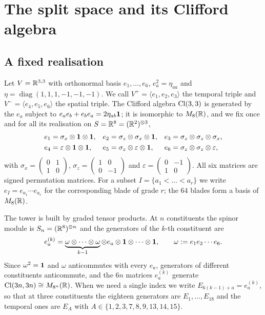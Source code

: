 \section{The split space and its Clifford algebra}
\label{sec:arena}

\subsection{A fixed realisation}

Let $V=\mathbb{R}^{3,3}$ with orthonormal basis $e_1,\dots,e_6$, $e_a^2=\eta_{aa}$ and $\eta=\operatorname{diag}(1,1,1,-1,-1,-1)$.
We call $V^+=\langle e_1,e_2,e_3\rangle$ the temporal triple and $V^-=\langle e_4,e_5,e_6\rangle$ the spatial triple. The
Clifford algebra $\mathrm{Cl}(3,3)$ is generated by the $e_a$ subject to $e_ae_b+e_be_a=2\eta_{ab}\mathbf 1$; it is isomorphic to
$M_8(\mathbb{R})$, and we fix once and for all its realisation on $S=\mathbb{R}^8=(\mathbb{R}^2)^{\otimes3}$,
\begin{equation}
\label{eq:realisation}
\begin{aligned}
e_1&=\sigma_x\otimes\mathbf 1\otimes\mathbf 1, & e_2&=\sigma_z\otimes\sigma_x\otimes\mathbf 1, & e_3&=\sigma_z\otimes\sigma_z\otimes\sigma_x,\\
e_4&=\varepsilon\otimes\mathbf 1\otimes\mathbf 1, & e_5&=\sigma_z\otimes\varepsilon\otimes\mathbf 1, & e_6&=\sigma_z\otimes\sigma_z\otimes\varepsilon,
\end{aligned}
\end{equation}
with $\sigma_x=\left(\begin{smallmatrix}0&1\\1&0\end{smallmatrix}\right)$,
$\sigma_z=\left(\begin{smallmatrix}1&0\\0&-1\end{smallmatrix}\right)$ and
$\varepsilon=\left(\begin{smallmatrix}0&-1\\1&0\end{smallmatrix}\right)$. All six matrices are signed permutation
matrices. For a subset $I=\{a_1<\dots<a_r\}$ we write $e_I=e_{a_1}\cdots e_{a_r}$ for the corresponding blade of grade $r$;
the $64$ blades form a basis of $M_8(\mathbb{R})$.

The tower is built by graded tensor products. At $n$ constituents the spinor module is $S_n=(\mathbb{R}^8)^{\otimes n}$ and the
generators of the $k$-th constituent are
\begin{equation}
\label{eq:tower}
e^{(k)}_a=\underbrace{\omega\otimes\cdots\otimes\omega}_{k-1}\otimes e_a\otimes\mathbf 1\otimes\cdots\otimes\mathbf 1,
\qquad \omega:=e_1e_2\cdots e_6 .
\end{equation}
Since $\omega^2=\mathbf 1$ and $\omega$ anticommutes with every $e_a$, generators of different constituents anticommute, and the
$6n$ matrices $e^{(k)}_a$ generate $\mathrm{Cl}(3n,3n)\cong M_{8^n}(\mathbb{R})$. When we need a single index we write
$E_{6(k-1)+a}=e^{(k)}_a$, so that at three constituents the eighteen generators are $E_1,\dots,E_{18}$ and the temporal
ones are $E_A$ with $A\in\{1,2,3,7,8,9,13,14,15\}$.

